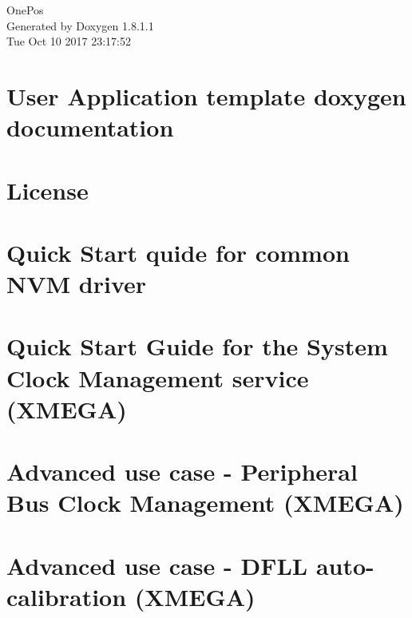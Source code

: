 \documentclass{book}
\begin{document}
\hypersetup{pageanchor=false,citecolor=blue}
\begin{titlepage}
\vspace*{7cm}
\begin{center}
{\Large One\-Pos }\\
\vspace*{1cm}
{\large Generated by Doxygen 1.8.1.1}\\
\vspace*{0.5cm}
{\small Tue Oct 10 2017 23:17:52}\\
\end{center}
\end{titlepage}
\clearemptydoublepage
{}
\tableofcontents
\clearemptydoublepage
{}
\hypersetup{pageanchor=true,citecolor=blue}
\chapter{User Application template doxygen documentation}
\label{index}\hypertarget{index}{}
\chapter{License}
\label{License}
\hypertarget{License}{}

\chapter{Quick Start quide for common N\-V\-M driver}
\label{common_nvm_quickstart}
\hypertarget{common_nvm_quickstart}{}

\chapter{Quick Start Guide for the System Clock Management service (X\-M\-E\-G\-A)}
\label{sysclk_quickstart}
\hypertarget{sysclk_quickstart}{}

\chapter{Advanced use case -\/ Peripheral Bus Clock Management (X\-M\-E\-G\-A)}
\label{sysclk_quickstart_use_case_2}
\hypertarget{sysclk_quickstart_use_case_2}{}

\chapter{Advanced use case -\/ D\-F\-L\-L auto-\/calibration (X\-M\-E\-G\-A)}
\label{sysclk_quickstart_use_case_3}
\hypertarget{sysclk_quickstart_use_case_3}{}

\end{document}

